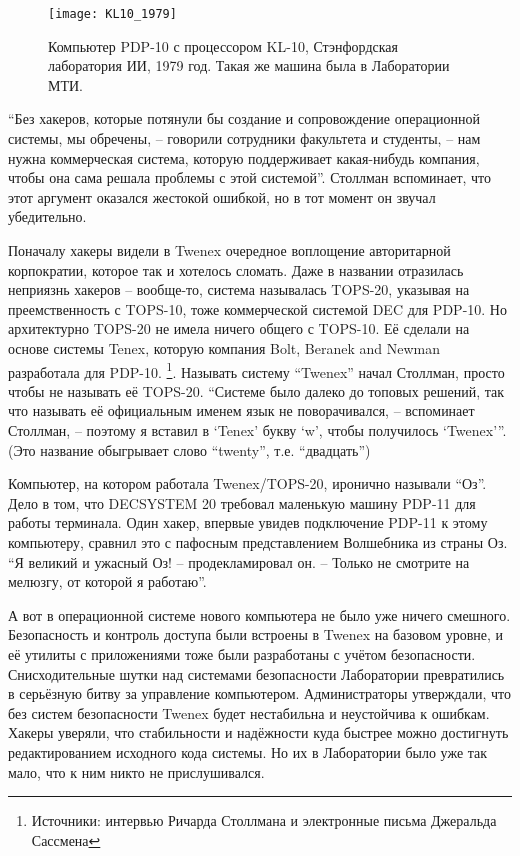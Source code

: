 \begin{figure}[ht] \centering
  \texttt{[image: KL10\_1979]}
  \caption{Компьютер PDP-10 с процессором KL-10, Стэнфордская лаборатория ИИ, 1979 год. Такая же машина была в Лаборатории МТИ.}
\end{figure}

\enquote{Без хакеров, которые потянули бы создание и сопровождение операционной системы, мы обречены, -- говорили сотрудники факультета и студенты, -- нам нужна коммерческая система, которую поддерживает какая-нибудь компания, чтобы она сама решала проблемы с этой системой}. Столлман вспоминает, что этот аргумент оказался жестокой ошибкой, но в тот момент он звучал убедительно.

Поначалу хакеры видели в Twenex очередное воплощение авторитарной корпократии, которое так и хотелось сломать. Даже в названии отразилась неприязнь хакеров -- вообще-то, система называлась TOPS-20, указывая на преемственность с TOPS-10, тоже коммерческой системой DEC для PDP-10. Но архитектурно TOPS-20 не имела ничего общего с TOPS-10. Её сделали на основе системы Tenex, которую компания Bolt, Beranek and Newman разработала для PDP-10. \footnote{Источники: интервью Ричарда Столлмана и электронные письма Джеральда Сассмена}. Называть систему \enquote{Twenex} начал Столлман, просто чтобы не называть её TOPS-20. \enquote{Системе было далеко до топовых решений, так что называть её официальным именем язык не поворачивался, -- вспоминает Столлман, -- поэтому я вставил в \enquote{Tenex} букву \enquote{w}, чтобы получилось \enquote{Twenex}}. (Это название обыгрывает слово \enquote{twenty}, т.е. \enquote{двадцать})

Компьютер, на котором работала Twenex/TOPS-20, иронично называли \enquote{Оз}. Дело в том, что DECSYSTEM 20 требовал маленькую машину PDP-11 для работы терминала. Один хакер, впервые увидев подключение PDP-11 к этому компьютеру, сравнил это с пафосным представлением Волшебника из страны Оз. \enquote{Я великий и ужасный Оз! -- продекламировал он. -- Только не смотрите на мелюзгу, от которой я работаю}.

А вот в операционной системе нового компьютера не было уже ничего смешного. Безопасность и контроль доступа были встроены в Twenex на базовом уровне, и её утилиты с приложениями тоже были разработаны с учётом безопасности. Снисходительные шутки над системами безопасности Лаборатории превратились в серьёзную битву за управление компьютером. Администраторы утверждали, что без систем безопасности Twenex будет нестабильна и неустойчива к ошибкам. Хакеры уверяли, что стабильности и надёжности куда быстрее можно достигнуть редактированием исходного кода системы. Но их в Лаборатории было уже так мало, что к ним никто не прислушивался.


